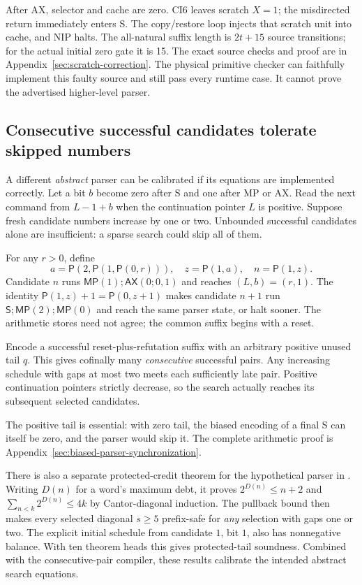 \documentclass[11pt]{article}
\newcommand{\pair}{\mathsf P}
\newcommand{\AX}{\mathsf{AX}}
\newcommand{\MP}{\mathsf{MP}}
\newcommand{\Tr}{\mathsf S}
\newcommand{\file}[1]{{\small\path{#1}}}
\begin{document}
After AX, selector and cache are zero. CI6 leaves scratch
$X=1$; the misdirected return immediately enters S.
The copy/restore loop injects that scratch unit into
cache, and NIP halts. The all-natural suffix length is
$2t+15$ source transitions; for the actual initial
zero gate it is 15. The exact source checks and proof
are in Appendix~\ref{sec:scratch-correction}.
The physical primitive checker can faithfully implement
this faulty source and still pass every runtime case.
It cannot prove the advertised higher-level parser.

\subsection{Consecutive successful candidates tolerate skipped numbers}

A different \emph{abstract} parser can be calibrated if its
equations are implemented correctly. Let a bit $b$ become
zero after S and one after MP or AX. Read the next command
from $L-1+b$ when the continuation pointer $L$ is positive.
Suppose fresh candidate numbers increase by one or two.
Unbounded successful candidates alone are insufficient:
a sparse search could skip all of them.

For any $r>0$, define
\[
 a=\pair(2,\pair(1,\pair(0,r))),\quad
 z=\pair(1,a),\quad n=\pair(1,z).
\]
Candidate $n$ runs
$\MP(1);\AX(0;0,1)$ and reaches $(L,b)=(r,1)$.
The identity
$\pair(1,z)+1=\pair(0,z+1)$ makes candidate $n+1$
run $\Tr;\MP(2);\MP(0)$ and reach the same parser
state, or halt sooner. The arithmetic stores need
not agree; the common suffix begins with a reset.

Encode a successful reset-plus-refutation suffix
with an arbitrary positive unused tail $q$.
This gives cofinally many \emph{consecutive}
successful pairs. Any increasing schedule with
gaps at most two meets each sufficiently late
pair. Positive continuation pointers strictly
decrease, so the search actually reaches its
subsequent selected candidates.

The positive tail is essential: with zero tail,
the biased encoding of a final S can itself be
zero, and the parser would skip it. The complete
arithmetic proof is Appendix~\ref{sec:biased-parser-synchronization}.

There is also a separate protected-credit theorem
for the hypothetical parser in
\file{research/biased_credit_proof.md}. Writing
$D(n)$ for a word's maximum debt, it proves
$2^{D(n)}\le n+2$ and
$\sum_{n<k}2^{D(n)}\le4k$ by Cantor-diagonal
induction. The pullback bound then makes every
selected diagonal $s\ge5$ prefix-safe for
\emph{any} selection with gaps one or two.
The explicit initial schedule from candidate
$1$, bit $1$, also has nonnegative balance.
With ten theorem heads this gives protected-tail
soundness. Combined with the consecutive-pair
compiler, these results calibrate the intended
abstract search equations.
\end{document}
